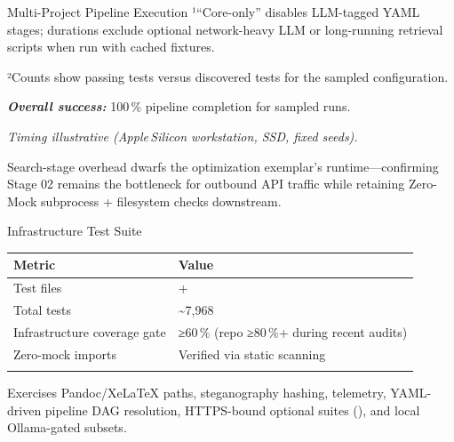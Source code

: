 \documentclass[
  ignorenonframetext,
]{beamer}
\newcounter{none} %
\begin{document}
\begin{frame}{Multi-Project Pipeline
Execution}
¹``Core-only'' disables LLM-tagged YAML stages; durations exclude
optional network-heavy LLM or long-running retrieval scripts when run
with cached fixtures.

²Counts show passing tests versus discovered tests for the sampled
configuration.

\textbf{\emph{Overall success:}} 100\,\% pipeline completion for sampled
runs.

\emph{Timing illustrative (Apple\,Silicon workstation, SSD, fixed
seeds).}

Search-stage overhead dwarfs the optimization exemplar's
runtime---confirming Stage 02 remains the bottleneck for outbound API
traffic while retaining Zero-Mock subprocess + filesystem checks
downstream.
\end{frame}

\begin{frame}{Infrastructure Test Suite}
\protect{}\label{infrastructure-test-suite}
{\def\LTcaptype{none} %
\begin{longtable}[]{@{}
  >{\raggedright\arraybackslash}p{}
  >{\raggedright\arraybackslash}p{}@{}}
\toprule\noalign{}
\begin{minipage}[b]{\linewidth}\raggedright
Metric
\end{minipage} & \begin{minipage}[b]{\linewidth}\raggedright
Value
\end{minipage} \\
\midrule\noalign{}
\endhead
Test files & 470+ \\
Total tests & \textasciitilde7,968 \\
Infrastructure coverage gate & ≥60\,\% (repo ≥80\,\%+ during recent
audits) \\
Zero-mock imports & Verified via static scanning \\
\bottomrule\noalign{}
\end{longtable}
}

Exercises Pandoc/XeLaTeX paths, steganography hashing, telemetry,
YAML-driven pipeline DAG resolution, HTTPS-bound optional suites
(), and local Ollama-gated subsets.
\end{frame}
\end{document}
